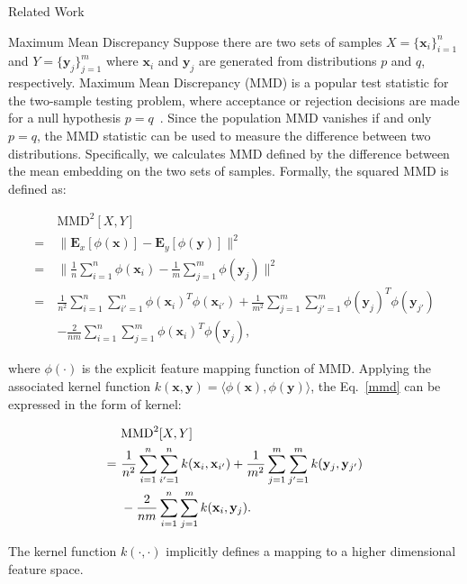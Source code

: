 \begin{section}{Related Work}
\begin{paragraph}{Maximum Mean Discrepancy} Suppose there are two sets of samples $X=\{\mathbf{x}_i\}_{i=1}^{n}$ and $Y = \{\mathbf{y}_j\}_{j=1}^{m}$ where $\mathbf{x}_i$ and $\mathbf{y}_j$ are generated from distributions $p$ and $q$, respectively. Maximum Mean Discrepancy (MMD) is a popular test statistic for the two-sample testing problem, where acceptance or rejection decisions are made for a null hypothesis $p = q$~\cite{mmd}. Since the population MMD vanishes if and only $p = q$, the MMD statistic can be used to measure the difference between two distributions. Specifically, we calculates MMD defined by the difference between the mean embedding on the two sets of samples. Formally, the squared MMD is defined as:
\begin{small}
\begin{equation}\label{mmd}
\begin{aligned}
&  \text{MMD}^2[X, Y]\\
		 = ~ &\| \mathbf{E}_x[\phi(\mathbf{x})] - \mathbf{E}_y[\phi(\mathbf{y})] \|^2\\
		= ~&\| \frac{1}{n}\sum_{i=1}^{n}\phi(\mathbf{x}_i) - \frac{1}{m}\sum_{j=1}^{m}\phi(\mathbf{y}_j) \|^2\\
		= ~&\frac{1}{n^2}\sum_{i=1}^{n}\sum_{i'=1}^{n}\phi(\mathbf{x}_i)^T\phi(\mathbf{x}_{i'}) + 
		   \frac{1}{m^2}\sum_{j=1}^{m}\sum_{j'=1}^{m}\phi(\mathbf{y}_j)^T\phi(\mathbf{y}_{j'}) \\
		&   -\frac{2}{nm}\sum_{i=1}^{n}\sum_{j=1}^{m}\phi(\mathbf{x}_i)^T\phi(\mathbf{y}_{j}),
\end{aligned}
\end{equation}
\end{small}
where $\phi(\cdot)$ is the explicit feature mapping function of MMD. Applying the associated kernel function $k(\mathbf{x}, \mathbf{y}) = \langle\phi(\mathbf{x}), \phi(\mathbf{y})\rangle$, the Eq.~\ref{mmd} can be expressed in the form of kernel:
\begin{small}
\begin{equation}{\label{mmd_kernel}}
\begin{aligned}
&\text{MMD}^2[X, Y]\\
	= ~ & \frac{1}{n^2}\sum_{i=1}^{n}\sum_{i'=1}^{n}k(\mathbf{x}_i, \mathbf{x}_{i'}) + 
		   \frac{1}{m^2}\sum_{j=1}^{m}\sum_{j'=1}^{m}k(\mathbf{y}_j, \mathbf{y}_{j'}) \\
	&	   -\frac{2}{nm}\sum_{i=1}^{n}\sum_{j=1}^{m}k(\mathbf{x}_i, \mathbf{y}_j).
\end{aligned}
\end{equation}
\end{small}
The kernel function $k(\cdot, \cdot)$ implicitly defines a mapping to a higher dimensional feature space.
\end{paragraph}

\end{section}




















